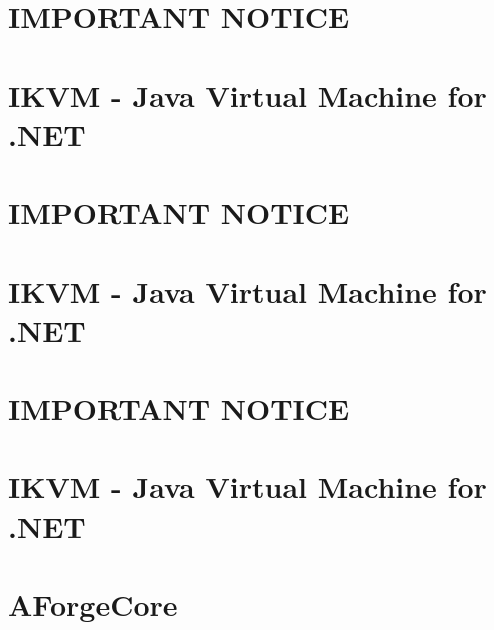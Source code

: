 \documentclass[twoside]{book}
\newcommand{\+}{\discretionary{\mbox{\scriptsize$\hookleftarrow$}}{}{}}
\begin{document}
\chapter{IMPORTANT NOTICE}
\label{md_bin__release_net6_0_windows_publish_ikvm_win7_x64__l_i_c_e_n_s_e}

\chapter{IKVM -\/ Java Virtual Machine for .NET}
\label{md_bin__release_net6_0_windows_publish_ikvm_win7_x64__r_e_a_d_m_e}

\chapter{IMPORTANT NOTICE}
\label{md_bin__release_net6_0_windows_publish_ikvm_win7_x86__l_i_c_e_n_s_e}

\chapter{IKVM -\/ Java Virtual Machine for .NET}
\label{md_bin__release_net6_0_windows_publish_ikvm_win7_x86__r_e_a_d_m_e}

\chapter{IMPORTANT NOTICE}
\label{md_bin__release_net6_0_windows_publish_ikvm_win81_arm__l_i_c_e_n_s_e}

\chapter{IKVM -\/ Java Virtual Machine for .NET}
\label{md_bin__release_net6_0_windows_publish_ikvm_win81_arm__r_e_a_d_m_e}

\chapter{AForge\+Core}
\label{md__microscope__a_forge_core__r_e_a_d_m_e}

\end{document}
